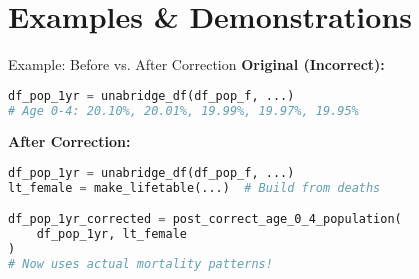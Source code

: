 \documentclass[aspectratio=169]{beamer}
\begin{document}
\section{Examples \& Demonstrations}

\begin{frame}[fragile]{Example: Before vs. After Correction}
\textbf{Original (Incorrect):}
\begin{lstlisting}[language=Python, basicstyle=\ttfamily\scriptsize]
df_pop_1yr = unabridge_df(df_pop_f, ...)
# Age 0-4: 20.10%, 20.01%, 19.99%, 19.97%, 19.95%
\end{lstlisting}

\textbf{After Correction:}
\begin{lstlisting}[language=Python, basicstyle=\ttfamily\scriptsize]
df_pop_1yr = unabridge_df(df_pop_f, ...)
lt_female = make_lifetable(...)  # Build from deaths

df_pop_1yr_corrected = post_correct_age_0_4_population(
    df_pop_1yr, lt_female
)
# Now uses actual mortality patterns!
\end{lstlisting}

\vspace{0.3cm}

\begin{center}
\end{center}
\end{frame}
\end{document}
